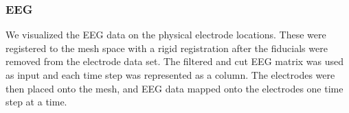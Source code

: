 \subsubsection{EEG}

We visualized the EEG data on the physical electrode locations. These were registered to the mesh space with a rigid registration after the fiducials were removed from the electrode data set. The filtered and cut EEG matrix was used as input and each time step was represented as a column. The electrodes were then placed onto the mesh, and EEG data mapped onto the electrodes one time step at a time. 